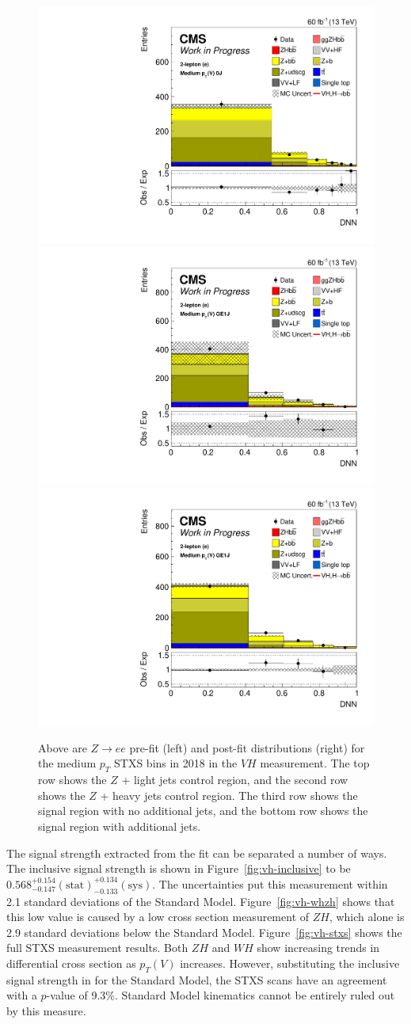 \begin{figure}
  \includegraphics[width=0.35\linewidth]{figures/210322_STXSfine_400split_unblinded_Xbb_025349b6_postfitplots/plot_shapes_vhbb_Zee_5_13TeV2018_postfit.pdf} \\
  \includegraphics[width=0.35\linewidth]{figures/210322_STXSfine_400split_unblinded_Xbb_025349b6_postfitplots/plot_shapes_vhbb_Zee_9_13TeV2018_prefit.pdf}
  \includegraphics[width=0.35\linewidth]{figures/210322_STXSfine_400split_unblinded_Xbb_025349b6_postfitplots/plot_shapes_vhbb_Zee_9_13TeV2018_postfit.pdf} \\
  \caption[$Z\rightarrow ee$ $V\!H$ distributions for medium $p_T$ in 2018]{
    Above are $Z\rightarrow ee$ pre-fit (left) and post-fit distributions (right)
    for the medium $p_T$ STXS bins in 2018 in the $V\!H$ measurement.
    The top row shows the $Z$ + light jets control region, and
    the second row shows the $Z$ + heavy jets control region.
    The third row shows the signal region with no additional jets, and
    the bottom row shows the signal region with additional jets.
  }
  \label{fig:vh-zee-med-2018}
\end{figure}

The signal strength extracted from the fit can be separated a number of ways.
The inclusive signal strength is shown in Figure~\ref{fig:vh-inclusive} to be $0.568^{+0.154}_{-0.147} \mathrm{(stat)}^{+0.134}_{-0.133} \mathrm{(sys)}$.
The uncertainties put this measurement within 2.1 standard deviations of the Standard Model.
Figure~\ref{fig:vh-whzh} shows that this low value is caused by a low cross section measurement of $Z\!H$,
which alone is 2.9 standard deviations below the Standard Model.
Figure~\ref{fig:vh-stxs} shows the full STXS measurement results.
Both $Z\!H$ and $W\!H$ show increasing trends in differential cross section as $p_T(V)$ increases.
However, substituting the inclusive signal strength in for the Standard Model,
the STXS scans have an agreement with a $p$-value of 9.3\%.
Standard Model kinematics cannot be entirely ruled out by this measure.

